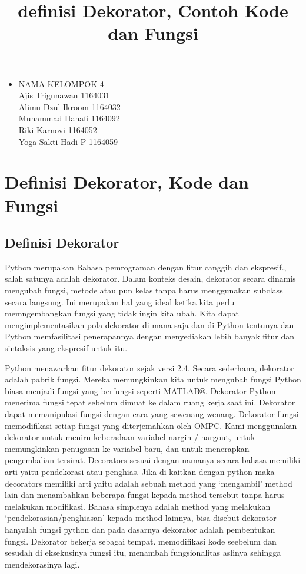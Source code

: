\documentclass[12pt,a4paper]{article}
\begin{document}
\title{definisi Dekorator, Contoh Kode dan Fungsi}
\maketitle

\begin{itemize}

\item
NAMA KELOMPOK 4\\
Ajis Trigunawan			1164031\\
Alimu Dzul Ikroom		1164032\\
Muhammad Hanafi			1164092\\
Riki Karnovi			1164052\\
Yoga Sakti Hadi P		1164059\\

\end{itemize}

\section{Definisi Dekorator, Kode dan Fungsi}

\subsection{Definisi Dekorator}
Python merupakan Bahasa pemrograman dengan fitur canggih dan ekspresif., salah satunya adalah dekorator. Dalam konteks desain, dekorator secara dinamis mengubah fungsi, metode atau pun kelas tanpa harus menggunakan subclass secara langsung. Ini merupakan hal yang ideal ketika kita perlu memngembangkan fungsi yang tidak ingin kita ubah. Kita dapat mengimplementasikan pola dekorator di mana saja dan di Python tentunya  dan Python memfasilitasi penerapannya dengan menyediakan lebih banyak fitur dan sintaksis yang ekspresif untuk itu. 

Python menawarkan fitur dekorator sejak versi 2.4. Secara sederhana, dekorator adalah pabrik fungsi. Mereka memungkinkan kita untuk mengubah fungsi Python biasa menjadi fungsi yang berfungsi seperti MATLAB®. Dekorator Python menerima fungsi tepat sebelum dimuat ke dalam ruang kerja saat ini. Dekorator dapat memanipulasi fungsi dengan cara yang sewenang-wenang. Dekorator fungsi memodifikasi setiap fungsi yang diterjemahkan oleh OMPC. Kami menggunakan dekorator untuk meniru keberadaan variabel nargin / nargout, untuk memungkinkan penugasan ke variabel baru, dan untuk menerapkan pengembalian tersirat.
Decorators sesuai dengan namanya secara bahasa memiliki arti yaitu pendekorasi atau penghias. Jika di kaitkan dengan python maka decorators memiliki arti yaitu adalah sebuah method yang ‘mengambil’ method lain dan menambahkan beberapa fungsi kepada method tersebut tanpa harus melakukan modifikasi. Bahasa simplenya adalah method yang melakukan ‘pendekorasian/penghiasan’ kepada method lainnya, bisa disebut dekorator hanyalah fungsi python dan pada dasarnya dekorator adalah pembentukan fungsi. Dekorator bekerja sebagai tempat. memodifikasi kode seebelum dan sesudah di eksekusinya fungsi itu, menambah fungsionalitas aslinya sehingga mendekorasinya lagi.
\end{document}
